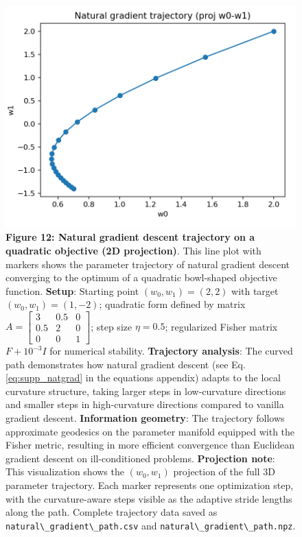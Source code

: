 \documentclass[
  10pt,
]{article}
\newcommand{\passthrough}[1]{#1}
\begin{document}
\begin{figure}
\centering
\includegraphics{../output/figures/natural_gradient_path.png}
\caption{\textbf{Figure 12: Natural gradient descent trajectory on a
quadratic objective (2D projection)}. This line plot with markers shows
the parameter trajectory of natural gradient descent converging to the
optimum of a quadratic bowl-shaped objective function. \textbf{Setup}:
Starting point \((w_0, w_1) = (2, 2)\) with target
\((w_0, w_1) = (1, -2)\); quadratic form defined by matrix
\(A = \begin{bmatrix}3 & 0.5 & 0\\ 0.5 & 2 & 0\\ 0 & 0 & 1\end{bmatrix}\);
step size \(\eta = 0.5\); regularized Fisher matrix \(F + 10^{-3} I\)
for numerical stability. \textbf{Trajectory analysis}: The curved path
demonstrates how natural gradient descent (see Eq.
\eqref{eq:supp_natgrad} in the equations appendix) adapts to the local
curvature structure, taking larger steps in low-curvature directions and
smaller steps in high-curvature directions compared to vanilla gradient
descent. \textbf{Information geometry}: The trajectory follows
approximate geodesics on the parameter manifold equipped with the Fisher
metric, resulting in more efficient convergence than Euclidean gradient
descent on ill-conditioned problems. \textbf{Projection note}: This
visualization shows the \((w_0, w_1)\) projection of the full 3D
parameter trajectory. Each marker represents one optimization step, with
the curvature-aware steps visible as the adaptive stride lengths along
the path. Complete trajectory data saved as
\passthrough{\lstinline!natural\_gradient\_path.csv!} and
\passthrough{\lstinline!natural\_gradient\_path.npz!}.}
\end{figure}
\end{document}
